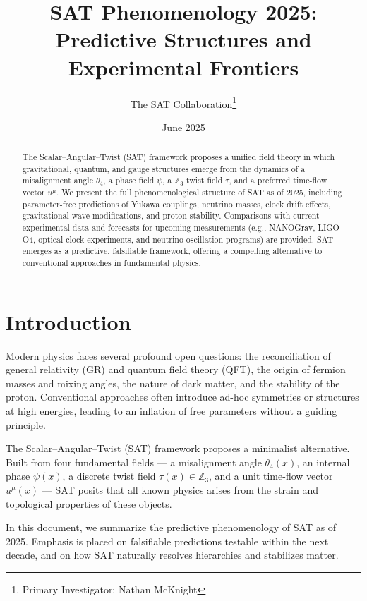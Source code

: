 \documentclass[12pt]{article}
\title{SAT Phenomenology 2025: Predictive Structures and Experimental Frontiers}
\author{The SAT Collaboration\thanks{Primary Investigator: Nathan McKnight}}
\date{June 2025}
\begin{document}
\maketitle

\begin{abstract}
The Scalar–Angular–Twist (SAT) framework proposes a unified field theory in which gravitational, quantum, and gauge structures emerge from the dynamics of a misalignment angle $\theta_4$, a phase field $\psi$, a $\mathbb{Z}_3$ twist field $\tau$, and a preferred time-flow vector $u^\mu$. We present the full phenomenological structure of SAT as of 2025, including parameter-free predictions of Yukawa couplings, neutrino masses, clock drift effects, gravitational wave modifications, and proton stability. Comparisons with current experimental data and forecasts for upcoming measurements (e.g., NANOGrav, LIGO O4, optical clock experiments, and neutrino oscillation programs) are provided. SAT emerges as a predictive, falsifiable framework, offering a compelling alternative to conventional approaches in fundamental physics.
\end{abstract}

\tableofcontents
\newpage

\section{Introduction}

Modern physics faces several profound open questions: the reconciliation of general relativity (GR) and quantum field theory (QFT), the origin of fermion masses and mixing angles, the nature of dark matter, and the stability of the proton. Conventional approaches often introduce ad-hoc symmetries or structures at high energies, leading to an inflation of free parameters without a guiding principle.

The Scalar–Angular–Twist (SAT) framework proposes a minimalist alternative. Built from four fundamental fields --- a misalignment angle $\theta_4(x)$, an internal phase $\psi(x)$, a discrete twist field $\tau(x) \in \mathbb{Z}_3$, and a unit time-flow vector $u^\mu(x)$ --- SAT posits that all known physics arises from the strain and topological properties of these objects.

In this document, we summarize the predictive phenomenology of SAT as of 2025. Emphasis is placed on falsifiable predictions testable within the next decade, and on how SAT naturally resolves hierarchies and stabilizes matter.
\end{document}
